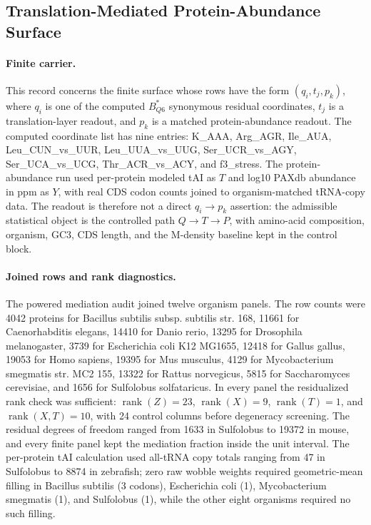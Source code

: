 \subsection{Translation-Mediated Protein-Abundance Surface}
\label{sec:q6-translation-mediated-protein-abundance-cross-layer}

\paragraph{Finite carrier.}
This record concerns the finite surface whose rows have the form $(q_i,t_j,p_k)$, where $q_i$ is one of the computed $B^*_{Q6}$ synonymous residual coordinates, $t_j$ is a translation-layer readout, and $p_k$ is a matched protein-abundance readout. The computed coordinate list has nine entries: K\_AAA, Arg\_AGR, Ile\_AUA, Leu\_CUN\_vs\_UUR, Leu\_UUA\_vs\_UUG, Ser\_UCR\_vs\_AGY, Ser\_UCA\_vs\_UCG, Thr\_ACR\_vs\_ACY, and f3\_stress. The protein-abundance run used per-protein modeled tAI as $T$ and log10 PAXdb abundance in ppm as $Y$, with real CDS codon counts joined to organism-matched tRNA-copy data. The readout is therefore not a direct $q_i \to p_k$ assertion: the admissible statistical object is the controlled path $Q \to T \to P$, with amino-acid composition, organism, GC3, CDS length, and the M-density baseline kept in the control block.

\paragraph{Joined rows and rank diagnostics.}
The powered mediation audit joined twelve organism panels. The row counts were 4042 proteins for Bacillus subtilis subsp. subtilis str. 168, 11661 for Caenorhabditis elegans, 14410 for Danio rerio, 13295 for Drosophila melanogaster, 3739 for Escherichia coli K12 MG1655, 12418 for Gallus gallus, 19053 for Homo sapiens, 19395 for Mus musculus, 4129 for Mycobacterium smegmatis str. MC2 155, 13322 for Rattus norvegicus, 5815 for Saccharomyces cerevisiae, and 1656 for Sulfolobus solfataricus. In every panel the residualized rank check was sufficient: $\operatorname{rank}(Z)=23$, $\operatorname{rank}(X)=9$, $\operatorname{rank}(T)=1$, and $\operatorname{rank}(X,T)=10$, with 24 control columns before degeneracy screening. The residual degrees of freedom ranged from 1633 in Sulfolobus to 19372 in mouse, and every finite panel kept the mediation fraction inside the unit interval. The per-protein tAI calculation used all-tRNA copy totals ranging from 47 in Sulfolobus to 8874 in zebrafish; zero raw wobble weights required geometric-mean filling in Bacillus subtilis (3 codons), Escherichia coli (1), Mycobacterium smegmatis (1), and Sulfolobus (1), while the other eight organisms required no such filling.

